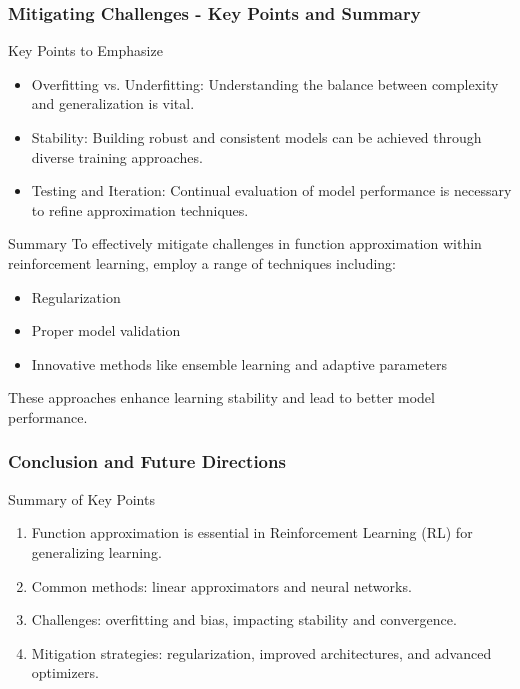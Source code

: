 \documentclass[aspectratio=169]{beamer}
\begin{document}
\begin{frame}[fragile]
    \frametitle{Mitigating Challenges - Key Points and Summary}
    \begin{block}{Key Points to Emphasize}
        \begin{itemize}
            \item Overfitting vs. Underfitting: Understanding the balance between complexity and generalization is vital.
            \item Stability: Building robust and consistent models can be achieved through diverse training approaches.
            \item Testing and Iteration: Continual evaluation of model performance is necessary to refine approximation techniques.
        \end{itemize}
    \end{block}

    \begin{block}{Summary}
        To effectively mitigate challenges in function approximation within reinforcement learning, employ a range of techniques including:
        \begin{itemize}
            \item Regularization
            \item Proper model validation
            \item Innovative methods like ensemble learning and adaptive parameters
        \end{itemize}
        These approaches enhance learning stability and lead to better model performance.
    \end{block}
\end{frame}

\begin{frame}[fragile]
    \frametitle{Conclusion and Future Directions}
    \begin{block}{Summary of Key Points}
        \begin{enumerate}
            \item Function approximation is essential in Reinforcement Learning (RL) for generalizing learning.
            \item Common methods: linear approximators and neural networks.
            \item Challenges: overfitting and bias, impacting stability and convergence.
            \item Mitigation strategies: regularization, improved architectures, and advanced optimizers.
        \end{enumerate}
    \end{block}
\end{frame}
\end{document}
